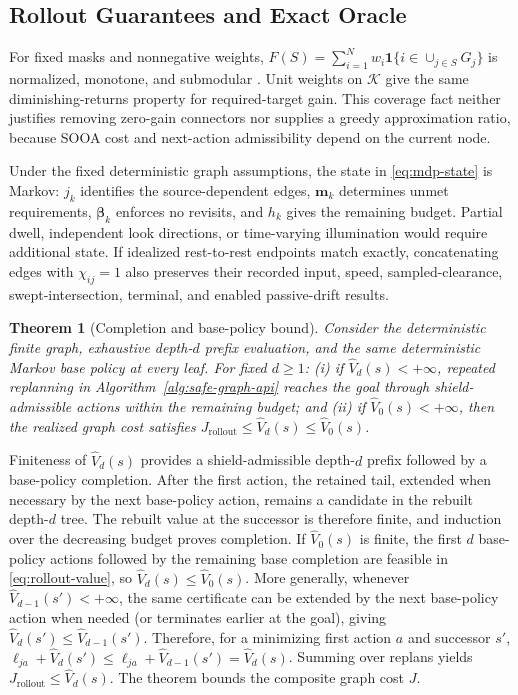 \documentclass{IEEEtaes}
\newtheorem{theorem}{Theorem}
\begin{document}
\subsection{Rollout Guarantees and Exact Oracle}
\label{sec:theory}

For fixed masks and nonnegative weights, $F(S)=\sum_{i=1}^{N}w_i\mathbf1\{i\in\cup_{j\in S}G_j\}$ is normalized, monotone, and submodular \cite{nemhauser1978submodular}. Unit weights on $\mathcal K$ give the same diminishing-returns property for required-target gain. This coverage fact neither justifies removing zero-gain connectors nor supplies a greedy approximation ratio, because SOOA cost and next-action admissibility depend on the current node.

Under the fixed deterministic graph assumptions, the state in \eqref{eq:mdp-state} is Markov: $j_k$ identifies the source-dependent edges, $\mathbf m_k$ determines unmet requirements, $\boldsymbol\beta_k$ enforces no revisits, and $h_k$ gives the remaining budget. Partial dwell, independent look directions, or time-varying illumination would require additional state. If idealized rest-to-rest endpoints match exactly, concatenating edges with $\chi_{ij}=1$ also preserves their recorded input, speed, sampled-clearance, swept-intersection, terminal, and enabled passive-drift results.

\begin{theorem}[Completion and base-policy bound]
\label{thm:rollout-guarantees}
Consider the deterministic finite graph, exhaustive depth-$d$ prefix evaluation, and the same deterministic Markov base policy at every leaf. For fixed $d\ge1$: (i) if $\widehat V_d(s)<+\infty$, repeated replanning in Algorithm~\ref{alg:safe-graph-api} reaches the goal through shield-admissible actions within the remaining budget; and (ii) if $\widehat V_0(s)<+\infty$, then the realized graph cost satisfies $J_{\mathrm{rollout}}\le\widehat V_d(s)\le\widehat V_0(s)$.
\end{theorem}

\begin{IEEEproof}
Finiteness of $\widehat V_d(s)$ provides a shield-admissible depth-$d$ prefix followed by a base-policy completion. After the first action, the retained tail, extended when necessary by the next base-policy action, remains a candidate in the rebuilt depth-$d$ tree. The rebuilt value at the successor is therefore finite, and induction over the decreasing budget proves completion. If $\widehat V_0(s)$ is finite, the first $d$ base-policy actions followed by the remaining base completion are feasible in \eqref{eq:rollout-value}, so $\widehat V_d(s)\le\widehat V_0(s)$. More generally, whenever $\widehat V_{d-1}(s')<+\infty$, the same certificate can be extended by the next base-policy action when needed (or terminates earlier at the goal), giving $\widehat V_d(s')\le\widehat V_{d-1}(s')$. Therefore, for a minimizing first action $a$ and successor $s'$, $\ell_{ja}+\widehat V_d(s')\le\ell_{ja}+\widehat V_{d-1}(s')=\widehat V_d(s)$. Summing over replans yields $J_{\mathrm{rollout}}\le\widehat V_d(s)$. The theorem bounds the composite graph cost $J$.
\end{IEEEproof}
\end{document}
